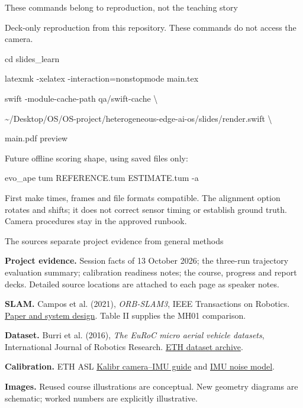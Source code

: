 \documentclass[aspectratio=169,12pt,t]{beamer}
\newcommand{\para}[1]{#1\par\medskip}
\begin{document}
\begin{frame}{These commands belong to reproduction, not the teaching story}

\para{Deck-only reproduction from this repository. These commands do not access the camera.}
{\small\ttfamily
cd slides\_learn\par
latexmk -xelatex -interaction=nonstopmode main.tex\par\medskip
swift -module-cache-path qa/swift-cache \textbackslash{}\par
\quad \textasciitilde/Desktop/OS/OS-project/heterogeneous-edge-ai-os/slides/render.swift \textbackslash{}\par
\quad main.pdf preview\par}
\medskip\para{Future offline scoring shape, using saved files only:}
{\small\ttfamily evo\_ape tum REFERENCE.tum ESTIMATE.tum -a\par}
\medskip\para{First make times, frames and file formats compatible. The alignment option rotates and shifts; it does not correct sensor timing or establish ground truth. Camera procedures stay in the approved runbook.}

\end{frame}

\begin{frame}{The sources separate project evidence from general methods}

{\small
\para{\textbf{Project evidence.} Session facts of 13 October 2026; the three-run trajectory evaluation summary; calibration readiness notes; the course, progress and report decks. Detailed source locations are attached to each page as speaker notes.}
\para{\textbf{SLAM.} Campos et al. (2021), \emph{ORB-SLAM3}, IEEE Transactions on Robotics. \href{https://arxiv.org/abs/2007.11898}{Paper and system design}. Table II supplies the MH01 comparison.}
\para{\textbf{Dataset.} Burri et al. (2016), \emph{The EuRoC micro aerial vehicle datasets}, International Journal of Robotics Research. \href{https://ethz-asl.github.io/datasets/}{ETH dataset archive}.}
\para{\textbf{Calibration.} ETH ASL \href{https://github.com/ethz-asl/kalibr/wiki/camera-imu-calibration}{Kalibr camera--IMU guide} and \href{https://github.com/ethz-asl/kalibr/wiki/IMU-Noise-Model}{IMU noise model}.}
\para{\textbf{Images.} Reused course illustrations are conceptual. New geometry diagrams are schematic; worked numbers are explicitly illustrative.}
}

\end{frame}
\end{document}
